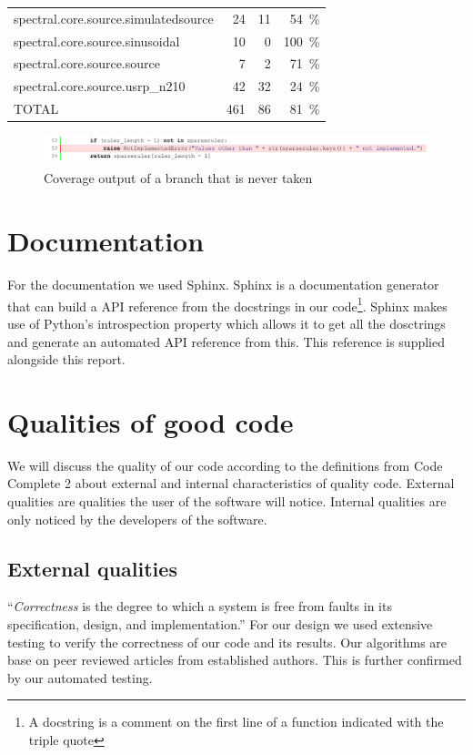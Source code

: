 \documentclass[a4paper, openany, oneside]{memoir}
\begin{document}
\begin{table}
{\begin{tabular}{l r r r}
spectral.core.source.simulatedsource       & 24         & 11   & \SI{54}{\percent}\\
spectral.core.source.sinusoidal            & 10         & 0    & \SI{100}{\percent} \\
spectral.core.source.source                & 7          & 2    & \SI{71}{\percent}\\
spectral.core.source.usrp\_n210            & 42         & 32   & \SI{24}{\percent}\\
\midrule
TOTAL                                      & 461        & 86   & \SI{81}{\percent}\\
\bottomrule
\end{tabular}}
\label{tbl:coverage}
\end{table}


\begin{figure}[h]
    \centering
    \includegraphics[width=\textwidth]{fig_branch_coverage.pdf}
    \caption{Coverage output of a branch that is never taken}
    \label{fig:coverage_branch}
\end{figure}

\section{Documentation}
\label{sec:documentation}
For the documentation we used Sphinx. Sphinx is a documentation generator that can build a API reference from the docstrings in our code\footnote{A docstring is a comment on the first line of a function indicated with the triple quote}. Sphinx makes use of Python's introspection property which allows it to get all the dosctrings and generate an automated API reference from this. This reference is supplied alongside this report.

\section{Qualities of good code}
We will discuss the quality of our code according to the definitions from Code Complete 2 about external and internal characteristics of quality code. External qualities are qualities the user of the software will notice. Internal qualities are only noticed by the developers of the software.\cite{mcconnell2004code}

\subsection{External qualities}
``\textit{Correctness} is the degree to which a system is free from faults in its specification, design, and implementation.'' For our design we used extensive testing to verify the correctness of our code and its results. Our algorithms are base on peer reviewed articles from established authors. This is further confirmed by our automated testing.
\end{document}
